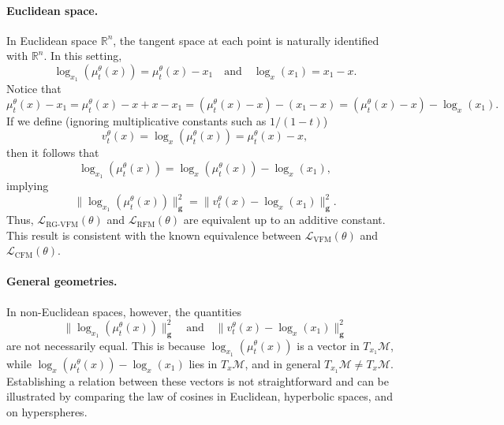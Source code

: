 \paragraph{Euclidean space.} In Euclidean space $\mathbb{R}^n$, the tangent space at each point is naturally identified with $\mathbb{R}^n$. In this setting,  
$$
\log_{x_1}(\mu_t^{\theta}(x)) = \mu_t^{\theta}(x) - x_1 \quad \text{and} \quad \log_{x}(x_1) = x_1 - x.
$$  
Notice that
$$
\mu_t^{\theta}(x) - x_1 = \mu_t^{\theta}(x) - x + x - x_1 = (\mu_t^{\theta}(x) - x) - (x_1 - x) = (\mu_t^{\theta}(x) - x) - \log_{x}(x_1).
$$  
If we define (ignoring multiplicative constants such as $1/(1-t)$)  
$$
v_t^{\theta}(x) = \log_{x}(\mu_t^{\theta}(x)) = \mu_t^{\theta}(x) - x,
$$  
then it follows that  
$$
\log_{x_1}(\mu_t^{\theta}(x)) = \log_{x}(\mu_t^{\theta}(x)) - \log_{x}(x_1),
$$  
implying  
$$
\|\log_{x_1}(\mu_t^{\theta}(x))\|_\mathbf{g}^2 = \|v_t^{\theta}(x) - \log_{x}(x_1)\|_\mathbf{g}^2.
$$  
Thus, $\mathcal{L}_{\text{RG-VFM}} (\theta)$ and $\mathcal{L}_{\text{RFM}} (\theta)$ are equivalent up to an additive constant. This result is consistent with the known equivalence between $\mathcal{L}_{\text{VFM}} (\theta)$ and $\mathcal{L}_{\text{CFM}} (\theta)$.

\paragraph{General geometries.}  In non-Euclidean spaces, however, the quantities  
$$
\|\log_{x_1}(\mu_t^{\theta}(x))\|_\mathbf{g}^2 \quad \text{and} \quad \|v_t^{\theta}(x) - \log_{x}(x_1)\|_\mathbf{g}^2
$$  
are not necessarily equal. This is because $\log_{x_1}(\mu_t^{\theta}(x))$ is a vector in $T_{x_1}\mathcal{M}$, while $\log_{x}(\mu_t^{\theta}(x)) - \log_{x}(x_1)$ lies in $T_x\mathcal{M}$, and in general $T_{x_1}\mathcal{M} \neq T_x\mathcal{M}$. Establishing a relation between these vectors is not straightforward and can be illustrated by comparing the law of cosines in Euclidean, hyperbolic spaces, and on hyperspheres.


